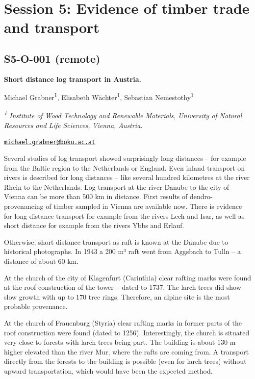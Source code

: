 \documentclass[
]{book}
\begin{document}
\hypertarget{session-5-evidence-of-timber-trade-and-transport}{%
\chapter*{Session 5: Evidence of timber trade and transport}\label{session-5-evidence-of-timber-trade-and-transport}}

\hypertarget{s5-o-001-remote}{%
\section*{S5-O-001 (remote)}\label{s5-o-001-remote}}

\textbf{Short distance log transport in Austria.}

Michael Grabner\textsuperscript{1}, Elisabeth Wächter\textsuperscript{1}, Sebastian Nemestothy\textsuperscript{1}

\emph{\textsuperscript{1} Institute of Wood Technology and Renewable Materials, University of Natural Resources and Life Sciences, Vienna, Austria.}

\href{mailto:michael.grabner@boku.ac.at}{\nolinkurl{michael.grabner@boku.ac.at}}

Several studies of log transport showed surprisingly long distances -- for example from the Baltic region to the Netherlands or England. Even inland transport on rivers is described for long distances -- like several hundred kilometres at the river Rhein to the Netherlands. Log transport at the river Danube to the city of Vienna can be more than 500 km in distance. First results of dendro-provenancing of timber sampled in Vienna are available now. There is evidence for long distance transport for example from the rivers Lech and Isar, as well as short distance for example from the rivers Ybbs and Erlauf.

Otherwise, short distance transport as raft is known at the Danube due to historical photographs. In 1943 a 200 m³ raft went from Aggsbach to Tulln -- a distance of about 60 km.

At the church of the city of Klagenfurt (Carinthia) clear rafting marks were found at the roof construction of the tower -- dated to 1737. The larch trees did show slow growth with up to 170 tree rings. Therefore, an alpine site is the most probable provenance.

At the church of Frauenburg (Styria) clear rafting marks in former parts of the roof construction were found (dated to 1256). Interestingly, the church is situated very close to forests with larch trees being part. The building is about 130 m higher elevated than the river Mur, where the rafts are coming from. A transport directly from the forests to the building is possible (even for larch trees) without upward transportation, which would have been the expected method.
\end{document}
